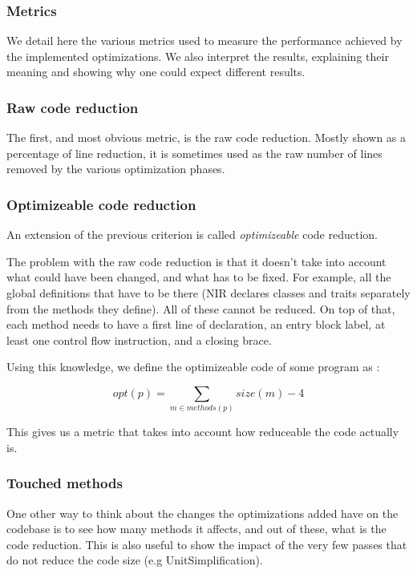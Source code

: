 \documentclass[11pt,a4paper]{article}
\newcommand{\scala}[1]{\textsf{#1}}
\begin{document}
\subsubsection{Metrics}

We detail here the various metrics used to measure the performance achieved by the implemented optimizations. We also interpret the results, explaining their meaning and showing why one could expect different results.

\subsubsection*{Raw code reduction}

The first, and most obvious metric, is the raw code reduction. Mostly shown as a percentage of line reduction, it is sometimes used as the raw number of lines removed by the various optimization phases.

\subsubsection*{Optimizeable code reduction}

An extension of the previous criterion is called \textit{optimizeable} code reduction.

The problem with the raw code reduction is that it doesn't take into account what could have been changed, and what has to be fixed. For example, all the global definitions that have to be there (NIR declares classes and traits separately from the methods they define). All of these cannot be reduced. On top of that, each method needs to have a first line of declaration, an entry block label, at least one control flow instruction, and a closing brace.

Using this knowledge, we define the optimizeable code of some program as :

$$ opt(p) = \sum\limits_{m \in methods(p)} size(m) - 4 $$

This gives us a metric that takes into account how reduceable the code actually is.

\subsubsection*{Touched methods}

One other way to think about the changes the optimizations added have on the codebase is to see how many methods it affects, and out of these, what is the code reduction. This is also useful to show the impact of the very few passes that do not reduce the code size (e.g \scala{UnitSimplification}).
\end{document}
